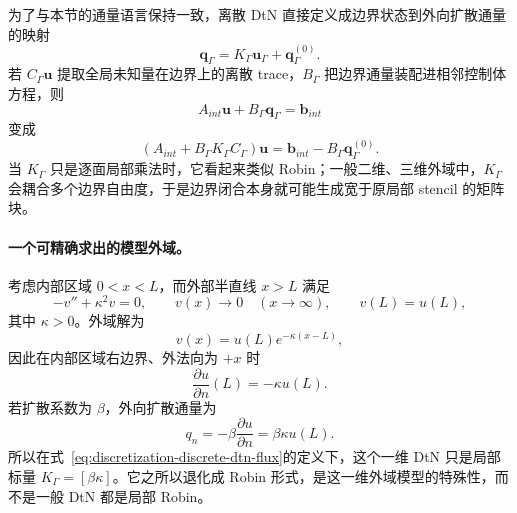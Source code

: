 为了与本节的通量语言保持一致，离散 DtN 直接定义成边界状态到外向扩散通量的映射
\begin{equation}
\boxed{
\bm q_\Gamma
=K_\Gamma\bm u_\Gamma+\bm q_\Gamma^{(0)}.
}
\label{eq:discretization-discrete-dtn-flux}
\end{equation}
若 $C_\Gamma\bm u$ 提取全局未知量在边界上的离散 trace，$B_\Gamma$ 把边界通量装配进相邻控制体方程，则
\begin{equation}
A_{int}\bm u+B_\Gamma\bm q_\Gamma=\bm b_{int}
\end{equation}
变成
\begin{equation}
\boxed{
\left(A_{int}+B_\Gamma K_\Gamma C_\Gamma\right)\bm u
=
\bm b_{int}-B_\Gamma\bm q_\Gamma^{(0)}.
}
\label{eq:discretization-dtn-matrix-form}
\end{equation}
当 $K_\Gamma$ 只是逐面局部乘法时，它看起来类似 Robin；一般二维、三维外域中，$K_\Gamma$ 会耦合多个边界自由度，于是边界闭合本身就可能生成宽于原局部 stencil 的矩阵块。

\paragraph{一个可精确求出的模型外域。}
考虑内部区域 $0<x<L$，而外部半直线 $x>L$ 满足
\begin{equation}
-v''+\kappa^2v=0,
\qquad
v(x)\to0\quad(x\to\infty),
\qquad
v(L)=u(L),
\end{equation}
其中 $\kappa>0$。外域解为
\begin{equation}
v(x)=u(L)e^{-\kappa(x-L)},
\end{equation}
因此在内部区域右边界、外法向为 $+x$ 时
\begin{equation}
\boxed{
\frac{\partial u}{\partial n}(L)=-\kappa u(L).
}
\label{eq:discretization-dtn-one-dimensional-exact}
\end{equation}
若扩散系数为 $\beta$，外向扩散通量为
\begin{equation}
q_n=-\beta\frac{\partial u}{\partial n}
=\beta\kappa u(L).
\end{equation}
所以在式~\eqref{eq:discretization-discrete-dtn-flux}的定义下，这个一维 DtN 只是局部标量 $K_\Gamma=[\beta\kappa]$。它之所以退化成 Robin 形式，是这一维外域模型的特殊性，而不是一般 DtN 都是局部 Robin。

